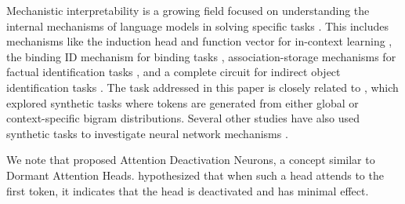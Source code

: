 Mechanistic interpretability is a growing field focused on understanding the internal mechanisms of language models in solving specific tasks \citep{elhage2021mathematical, geva2023dissecting, meng2022locating, nanda2023progress, olsson2022context, bietti2024birth, wang2022interpretability, feng2023language, todd2023function}. This includes mechanisms like the induction head and function vector for in-context learning \citep{elhage2021mathematical, olsson2022context, todd2023function, bietti2024birth}, the binding ID mechanism for binding tasks \citep{feng2023language}, association-storage mechanisms for factual identification tasks \citep{meng2022locating}, and a complete circuit for indirect object identification tasks \citep{wang2022interpretability}. The task addressed in this paper is closely related to \cite{bietti2024birth}, which explored synthetic tasks where tokens are generated from either global or context-specific bigram distributions. Several other studies have also used synthetic tasks to investigate neural network mechanisms \citep{charton2022my, liu2022towards, nanda2023progress, allen2023physics, zhu2023physics, guo2023transformers, zhang2022unveiling}. 




We note that \citet{gurnee2024universal} proposed Attention Deactivation Neurons, a concept similar to Dormant Attention Heads. \citet{gurnee2024universal} hypothesized that when such a head attends to the first token, it indicates that the head is deactivated and has minimal effect. 










